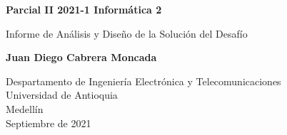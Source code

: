 \documentclass{article}
\begin{document}
\begin{titlepage}
    \begin{center}
        \vspace*{1cm}
            
        \Huge
        \textbf{Parcial II 2021-1 Informática 2}
            
        \vspace{0.5cm}
        \LARGE
        Informe de Análisis y Diseño de la Solución del Desafío
            
        \vspace{1.5cm}
            
        \textbf{Juan Diego Cabrera Moncada}\\
            
        \vfill
            
        \vspace{0.8cm}
            
        \Large
        Despartamento de Ingeniería Electrónica y Telecomunicaciones\\
        Universidad de Antioquia\\
        Medellín\\
        Septiembre de 2021
            
    \end{center}
\end{titlepage}

\tableofcontents
\newpage
\end{document}
